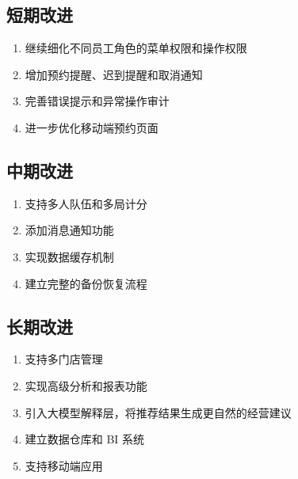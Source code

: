 \subsection{短期改进}

\begin{enumerate}
  \item 继续细化不同员工角色的菜单权限和操作权限
  \item 增加预约提醒、迟到提醒和取消通知
  \item 完善错误提示和异常操作审计
  \item 进一步优化移动端预约页面
\end{enumerate}

\subsection{中期改进}

\begin{enumerate}
  \item 支持多人队伍和多局计分
  \item 添加消息通知功能
  \item 实现数据缓存机制
  \item 建立完整的备份恢复流程
\end{enumerate}

\subsection{长期改进}

\begin{enumerate}
  \item 支持多门店管理
  \item 实现高级分析和报表功能
  \item 引入大模型解释层，将推荐结果生成更自然的经营建议
  \item 建立数据仓库和 BI 系统
  \item 支持移动端应用
\end{enumerate}
